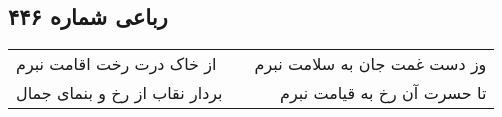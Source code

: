 \begin{center}
\section*{رباعی شماره ۴۴۶}
\label{sec:sh446}
\begin{longtable}{l p{0.5cm} r}
از خاک درت رخت اقامت نبرم
&&
وز دست غمت جان به سلامت نبرم
\\
بردار نقاب از رخ و بنمای جمال
&&
تا حسرت آن رخ به قیامت نبرم
\\
\end{longtable}
\end{center}
